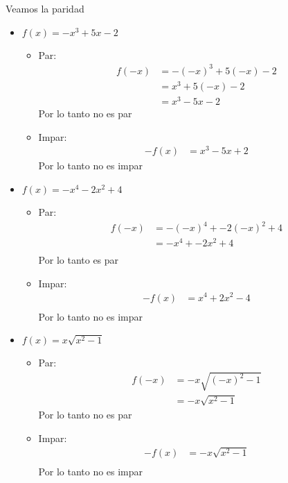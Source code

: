 \documentclass[journal,onecolumn,10pt,fleqn]{IEEEtran}%
\theoremstyle{break}                                            %
\begin{document}
\section{}
  Veamos la paridad
  \begin{itemize}
    \item $f(x) = -x^3+ 5x - 2$
    \begin{itemize}
      \item Par: 
      \begin{align*}
        f(-x) 
          &= -(-x)^3 + 5(-x) - 2 \\
          &= x^3 + 5(-x) - 2    \\
          &= x^3 - 5x - 2   
      \end{align*}
      Por lo tanto no es par

      \item Impar: 
      \begin{align*}
        -f(x) 
          &= x^3 - 5x + 2   
      \end{align*}
      Por lo tanto no es impar
    \end{itemize}

    \item $f(x) = -x^4 -2x^2 + 4$
    \begin{itemize}
      \item Par: 
      \begin{align*}
        f(-x) 
          &= -(-x)^4 + -2(-x)^2 + 4 \\
          &= -x^4 + -2x^2 + 4    \\
      \end{align*}
      Por lo tanto es par

      \item Impar: 
      \begin{align*}
        -f(x) 
          &= x^4 +2x^2 - 4 \\
      \end{align*}
      Por lo tanto no es impar
    \end{itemize}

    \item $f(x) = x\sqrt{x^2 - 1}$
    \begin{itemize}
      \item Par: 
      \begin{align*}
        f(-x) 
          &= -x\sqrt{(-x)^2 - 1} \\
          &= -x\sqrt{x^2 - 1}
      \end{align*}
      Por lo tanto no es par

      \item Impar: 
      \begin{align*}
        -f(x) 
          &= -x\sqrt{x^2 - 1} \\
      \end{align*}
      Por lo tanto no es impar
    \end{itemize}

  \end{itemize}
\end{document}

